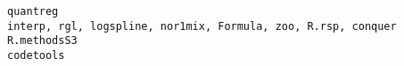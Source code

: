 \documentclass[
  letterpaper,
  DIV=11,
  numbers=noendperiod]{scrreprt}
\begin{document}
\begin{verbatim}
quantreg                                                                                                                                                                                                                                                                                                                                                                                                                                                                                                                                                                                                                                                                                                                                                                                                                                                                                                                                                                                                                                                                                                                                                                                                                                        interp, rgl, logspline, nor1mix, Formula, zoo, R.rsp, conquer
R.methodsS3                                                                                                                                                                                                                                                                                                                                                                                                                                                                                                                                                                                                                                                                                                                                                                                                                                                                                                                                                                                                                                                                                                                                                                                                                                                                                         codetools

\end{verbatim}
\end{document}
